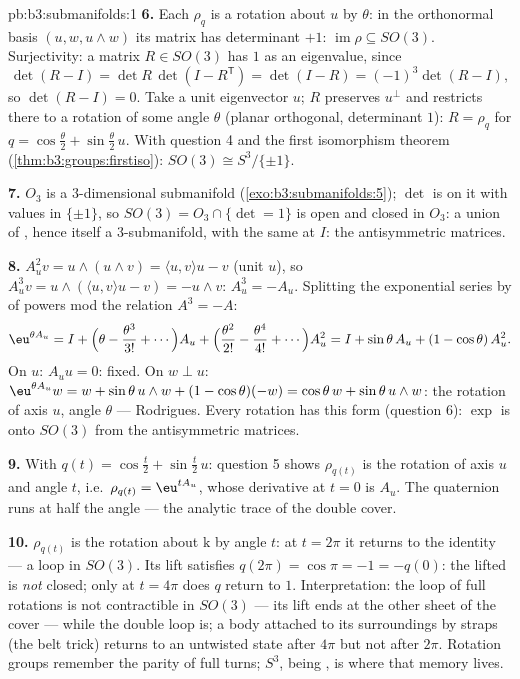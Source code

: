 \begin{solution}{pb:b3:submanifolds:1}
\textbf{6.} Each $\rho_q$ is a rotation about $u$ by
$\theta$: in the orthonormal basis $(u, w, u\wedge w)$ its
matrix has determinant $+1$: $\operatorname{im}\rho \subseteq
SO(3)$. Surjectivity: a matrix $R \in SO(3)$ has $1$ as an
eigenvalue, since
\[
\det(R - I) = \det R\,\det(I - R^{\mathsf T}) = \det(I - R)
= (-1)^3\det(R - I),
\]
so $\det(R - I) = 0$. Take a unit eigenvector $u$; $R$
preserves $u^\perp$ and restricts there to a rotation of
some angle $\theta$ (planar orthogonal, determinant $1$):
$R = \rho_q$ for $q = \cos\frac\theta2 +
\sin\frac\theta2\,u$. With question 4 and the first
isomorphism theorem (\cref{thm:b3:groups:firstiso}): $SO(3)
\cong S^3/\{\pm1\}$.

\textbf{7.} $O_3$ is a  $3$-dimensional submanifold
(\cref{exo:b3:submanifolds:5}); $\det$ is  on it
with values in $\{\pm1\}$, so $SO(3) = O_3\cap\{\det = 1\}$
is open and closed in $O_3$: a union of ,
hence itself a  $3$-submanifold, with the same  at $I$: the antisymmetric matrices.

\textbf{8.} $A_u^2v = u\wedge(u\wedge v) = \langle u,
v\rangle u - v$ (unit $u$), so $A_u^3v = u\wedge(\langle
u,v\rangle u - v) = -u\wedge v$: $A_u^3 = -A_u$. Splitting
the exponential series by  of powers mod the relation
$A^3 = -A$:
\[
\eu^{\theta A_u} = I + \Bigl(\theta - \frac{\theta^3}{3!} +
\cdots\Bigr)A_u + \Bigl(\frac{\theta^2}{2!} -
\frac{\theta^4}{4!} + \cdots\Bigr)A_u^2
= I + \sin\theta\,A_u + (1 - \cos\theta)\,A_u^2 .
\]
On $u$: $A_uu = 0$: fixed. On $w \perp u$: $\eu^{\theta
A_u}w = w + \sin\theta\,u\wedge w + (1 - \cos\theta)(-w) =
\cos\theta\,w + \sin\theta\,u\wedge w$: the rotation of axis
$u$, angle $\theta$ --- Rodrigues. Every rotation has this
form (question 6): $\exp$ is onto $SO(3)$ from the
antisymmetric matrices.

\textbf{9.} With $q(t) = \cos\frac t2 + \sin\frac t2\,u$:
question 5 shows $\rho_{q(t)}$ is the rotation of axis $u$
and angle $t$, i.e.\ $\rho_{q(t)} = \eu^{tA_u}$, whose
derivative at $t = 0$ is $A_u$. The quaternion runs at half
the angle --- the analytic trace of the double cover.

\textbf{10.} $\rho_{q(t)}$ is the rotation about $\mathrm k$
by angle $t$: at $t = 2\pi$ it returns to the identity ---
a loop in $SO(3)$. Its lift satisfies $q(2\pi) = \cos\pi =
-1 = -q(0)$: the lifted  is \emph{not} closed; only at
$t = 4\pi$ does $q$ return to $1$. Interpretation: the loop
of full rotations is not contractible in $SO(3)$ --- its
lift ends at the other sheet of the cover --- while the
double loop is; a body attached to its surroundings by
straps (the belt trick) returns to an untwisted state after
$4\pi$ but not after $2\pi$. Rotation groups remember the
parity of full turns; $S^3$, being , is
where that memory lives.


\end{solution}
